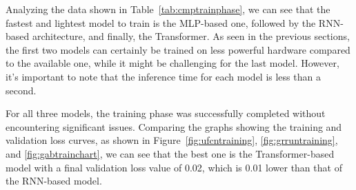 Analyzing the data shown in Table~\ref{tab:cmptrainphase}, we can see that the fastest and lightest model to train is the MLP-based one, followed by the RNN-based architecture, and finally, the Transformer. As seen in the previous sections, the first two models can certainly be trained on less powerful hardware compared to the available one, while it might be challenging for the last model. However, it's important to note that the inference time for each model is less than a second.

For all three models, the training phase was successfully completed without encountering significant issues. Comparing the graphs showing the training and validation loss curves, as shown in Figure~\ref{fig:ufcntraining}, \ref{fig:grruntraining}, and \ref{fig:gabtrainchart}, we can see that the best one is the Transformer-based model with a final validation loss value of 0.02, which is 0.01 lower than that of the RNN-based model.


